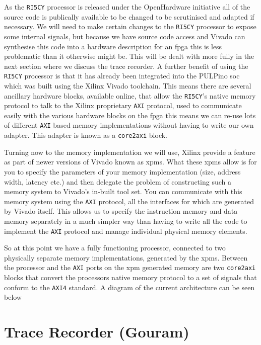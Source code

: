 As the \texttt{RI5CY} processor is released under the OpenHardware \cite{OpenSourceHardware} initiative all of the source code is publically available to be changed to be scrutinised and adapted if necessary. We will need to make certain changes to the \texttt{RI5CY} processor to expose some internal signals, but because we have source code access and Vivado can synthesise this code into a hardware description for an \gls{fpga} this is less problematic than it otherwise might be. This will be dealt with more fully in the next section where we discuss the trace recorder. A further benefit of using the \texttt{RI5CY} processor is that it has already been integrated into the PULPino \gls{soc} which was built using the Xilinx Vivado toolchain. This means there are several ancillary hardware blocks, available online, that allow the \texttt{RI5CY}'s native memory protocol to talk to the Xilinx proprietary \texttt{AXI} protocol, used to communicate easily with the various hardware blocks on the \gls{fpga} this means we can re-use lots of different \texttt{AXI} based memory implementations without having to write our own adapter. This adapter is known as a \texttt{core2axi} block. 

Turning now to the memory implementation we will use, Xilinx provide a feature as part of newer versions of Vivado known as \glspl{xpm}. What these \glspl{xpm} allow is for you to specify the parameters of your memory implementation (size, address width, latency etc.) and then delegate the problem of constructing such a memory system to Vivado's in-built tool set. You can communicate with this memory system using the \texttt{AXI} protocol, all the interfaces for which are generated by Vivado itself. This allows us to specify the instruction memory and data memory separately in a much simpler way than having to write all the code to implement the \texttt{AXI} protocol and manage individual physical memory elements. 

So at this point we have a fully functioning processor, connected to two physically separate memory implementations, generated by the \glspl{xpm}. Between the processor and the \texttt{AXI} ports on the \gls{xpm} generated memory are two \texttt{core2axi} blocks that convert the processors native memory protocol to a set of signals that conform to the \texttt{AXI4} standard. A diagram of the current architecture can be seen below


\section{Trace Recorder (Gouram)}

